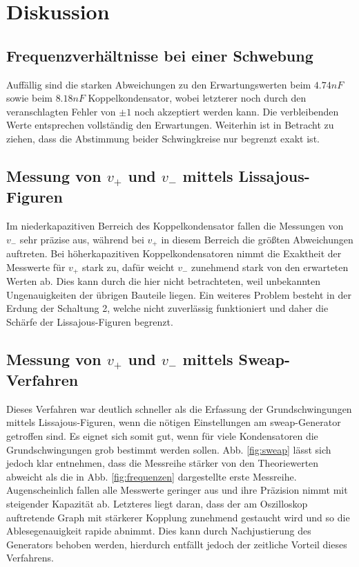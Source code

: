 \section{Diskussion}
\label{sec:Diskussion}

\subsection{Frequenzverhältnisse bei einer Schwebung}
\label{sec:Schwebung}

Auffällig sind die starken Abweichungen zu den Erwartungswerten beim $4.74nF$ sowie beim $8.18nF$ Koppelkondensator, wobei letzterer noch durch den veranschlagten Fehler von $\pm 1$ noch akzeptiert werden kann. Die verbleibenden Werte entsprechen vollständig den Erwartungen. Weiterhin ist in Betracht zu ziehen, dass die Abstimmung beider Schwingkreise nur begrenzt exakt ist.

\subsection{Messung von $v_+$ und $v_-$ mittels Lissajous-Figuren}
\label{sec:messung}

Im niederkapazitiven Berreich des Koppelkondensator fallen die Messungen von $v_-$ sehr präzise aus, während bei $v_+$ in diesem Berreich die größten Abweichungen auftreten. Bei höherkapazitiven Koppelkondensatoren nimmt die Exaktheit der Messwerte für $v_+$ stark zu, dafür weicht $v_-$ zunehmend stark von den erwarteten Werten ab. Dies kann durch die hier nicht betrachteten, weil unbekannten Ungenauigkeiten der übrigen Bauteile liegen. Ein weiteres Problem besteht in der Erdung der Schaltung 2, welche nicht zuverlässig funktioniert und daher die Schärfe der Lissajous-Figuren begrenzt.

\subsection{Messung von $v_+$ und $v_-$ mittels Sweap-Verfahren}
\label{sec:sweap}

Dieses Verfahren war deutlich schneller als die Erfassung der Grundschwingungen mittels Lissajous-Figuren, wenn die nötigen Einstellungen am sweap-Generator getroffen sind. Es eignet sich somit gut, wenn für viele Kondensatoren die Grundschwingungen grob bestimmt werden sollen. Abb. \ref{fig:sweap} lässt sich jedoch klar entnehmen, dass die Messreihe stärker von den Theoriewerten abweicht als die in Abb. \ref{fig:frequenzen} dargestellte erste Messreihe. Augenscheinlich fallen alle Messwerte geringer aus und ihre Präzision nimmt mit steigender Kapazität ab. Letzteres liegt daran, dass der am Oszilloskop auftretende Graph mit stärkerer Kopplung zunehmend gestaucht wird und so die Ablesegenauigkeit rapide abnimmt. Dies kann durch Nachjustierung des Generators behoben werden, hierdurch entfällt jedoch der zeitliche Vorteil dieses Verfahrens.

